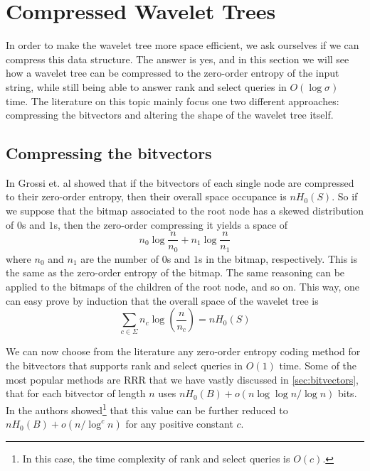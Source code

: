 \clearpage
\section{Compressed Wavelet Trees}
In order to make the wavelet tree more space efficient, we ask ourselves if we can compress this data structure. The answer is yes, and in this section we will see how a wavelet tree can be compressed to the zero-order entropy of the input string, while still being able to answer rank and select queries in $O(\log \sigma)$ time. The literature on this topic mainly focus one two different approaches: compressing the bitvectors and altering the shape of the wavelet tree itself.

\subsection{Compressing the bitvectors}
In \cite{GrossiWT2003} Grossi et. al showed that if the bitvectors of each single node are compressed to their zero-order entropy, then their overall space occupance is $n H_0(S)$. So if we suppose that the bitmap associated to the root node has a skewed distribution of $0$s and $1$s, then the zero-order compressing it yields a space of
\begin{equation}
    n_0 \log \frac{n}{n_0} + n_1 \log \frac{n}{n_1}
\end{equation}
where $n_0$ and $n_1$ are the number of $0$s and $1$s in the bitmap, respectively. This is the same as the zero-order entropy of the bitmap. The same reasoning can be applied to the bitmaps of the children of the root node, and so on. This way, one can easy prove by induction \cite{navarro2016compact} that the overall space of the wavelet tree is
\begin{equation}
    \sum_{c \in \Sigma} n_c \log (\frac{n}{n_c}) = n H_0(S)
\end{equation}

\noindent We can now choose from the literature any zero-order entropy coding method for the bitvectors that supports rank and select queries in $O(1)$ time. Some of the most popular methods are RRR \cite{RRR2002} that we have vastly discussed in \autoref{sec:bitvectors}, that for each bitvector of length $n$ uses $n H_0(B) + o(n \log \log n / \log n)$ bits. In \cite{patrascu2008succincter} the authors showed\footnote{In this case, the time complexity of rank and select queries is $O(c)$.} that this value can be further reduced to $n H_0(B) + o(n/\log^c n)$ for any positive constant $c$.

